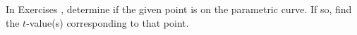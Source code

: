 {\noindent In Exercises}
{, determine if the given point is on the parametric curve.  If so, find the $t$-value(s) corresponding to that point.
}
